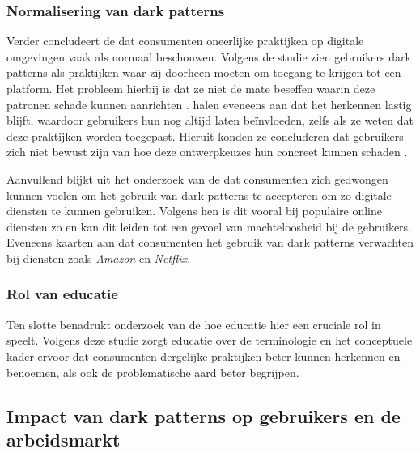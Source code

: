 \subsubsection{Normalisering van dark patterns}

Verder concludeert de \textcite{Commissie2022} dat consumenten oneerlijke praktijken op digitale omgevingen vaak als normaal beschouwen. Volgens de studie zien gebruikers dark patterns als praktijken waar zij doorheen moeten om toegang te krijgen tot een platform. Het probleem hierbij is dat ze niet de mate beseffen waarin deze patronen schade kunnen aanrichten \autocite{BongardBlanchy2021}. \textcite{BongardBlanchy2021} halen eveneens aan dat het herkennen lastig blijft, waardoor gebruikers hun nog altijd laten beïnvloeden, zelfs als ze weten dat deze praktijken worden toegepast. Hieruit konden ze concluderen dat gebruikers zich niet bewust zijn van hoe deze ontwerpkeuzes hun concreet kunnen schaden \autocite{BongardBlanchy2021}.

\vspace{1em}

Aanvullend blijkt uit het onderzoek van de \textcite{Commissie2022} dat consumenten zich gedwongen kunnen voelen om het gebruik van dark patterns te accepteren om zo digitale diensten te kunnen gebruiken. Volgens hen is dit vooral bij populaire online diensten zo en kan dit leiden tot een gevoel van machteloosheid bij de gebruikers. Eveneens kaarten \textcite{BongardBlanchy2021} aan dat consumenten het gebruik van dark patterns verwachten bij diensten zoals \textit{Amazon} en \textit{Netflix}. 

\vspace{1em}

\subsubsection{Rol van educatie}

Ten slotte benadrukt onderzoek van de \textcite{Commissie2022} hoe educatie hier een cruciale rol in speelt. Volgens deze studie zorgt educatie over de terminologie en het conceptuele kader ervoor dat consumenten dergelijke praktijken beter kunnen herkennen en benoemen, als ook de problematische aard beter begrijpen.

\vspace{1em}

\subsection{Impact van dark patterns op gebruikers en de arbeidsmarkt}
\label{subsec:impact-gebruikers}


